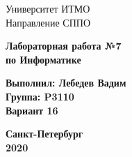 
\pagestyle{empty}


\begin{center}
	\Large Университет ИТМО\\
	Направление СППО\\
\end{center}

\vspace{8cm}
\begin{center}
	\Huge \textbf{Лабораторная работа №7\\
	по Информатике}
\end{center}

\vspace{9cm}
	\Large\textbf{Выполнил: Лебедев Вадим\\
	\hphantom \quad Группа: P3110\\
	\hphantom \quad Вариант 16}

\vspace{1cm}
	\begin{center}
		\Large \textbf{Санкт-Петербург\\
		2020}
\end{center}

